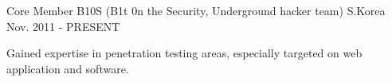 


\begin{cventries}


\cventry
{Core Member} %
{B10S (B1t 0n the Security, Underground hacker team)} %
{S.Korea} %
{Nov. 2011 - PRESENT} %
{ %
\begin{cvitems}
\item {Gained expertise in penetration testing areas, especially targeted on web application and software.}
\end{cvitems}
}

\end{cventries}